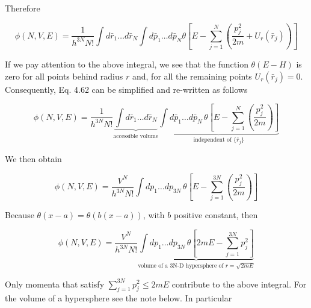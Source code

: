 \documentclass[12pt,a4paper]{report}
\newcommand{\esp}{\vspace{0.5cm}}
\begin{document}
	\esp
	
	\noindent Therefore
	
	\esp
	
	\begin{equation}
		\phi(N, V, E) = \frac{1}{h^{3N} N!} \int d\bar{r}_1 \dots d\bar{r}_N \int d\bar{p}_1 \dots d\bar{p}_N \theta \left[ E - \sum_{j=1}^N \left( \frac{p_j^2}{2m} + U_r(\bar{r}_j) \right) \right] \tag{4.62}
	\end{equation}
	
	\esp
	
	\noindent If we pay attention to the above integral, we see that the function $\theta(E - H)$ is zero for all points behind radius $r$ and, for all the remaining points $U_r(\bar{r}_j) = 0$. Consequently, Eq. 4.62 can be simplified and re-written as follows
	
	\esp
	
	\begin{equation}
		\phi(N,V,E) = \frac{1}{h^{3N} N!} \underbrace{\int d\bar{r}_1 \dots d\bar{r}_N}_{\text{accessible volume}} \underbrace{\int d\bar{p}_1 \dots d\bar{p}_N \, \theta \left[ E - \sum_{j=1}^N \left( \frac{p_j^2}{2m} \right) \right]}_{\text{independent of } \{\bar{r}_j\}} \tag{4.63}
	\end{equation}
	
	\esp
	
	\noindent We then obtain
	
	\esp
	
	\begin{equation}
		\phi(N,V,E) = \frac{V^N}{h^{3N} N!} \int d p_1 \dots d p_{3N} \, \theta \left[ E - \sum_{j=1}^{3N} \left( \frac{p_j^2}{2m} \right) \right] \tag{4.64}
	\end{equation}
	
	\esp
	
	\noindent Because $\theta(x - a) = \theta(b(x - a))$, with $b$ positive constant, then
	
	\esp
	
	\begin{equation}
		\phi(N,V,E) = \frac{V^N}{h^{3N} N!} \underbrace{\int d p_1 \dots d p_{3N} \, \theta \left[ 2mE - \sum_{j=1}^{3N} p_j^2 \right]}_{\text{volume of a 3N-D hypersphere of } r = \sqrt{2mE}} \tag{4.65}
	\end{equation}
	
	\esp
	
	\noindent Only momenta that satisfy $\sum_{j=1}^{3N} p_j^2 \leq 2mE$ contribute to the above integral. For the volume of a hypersphere see the note below. In particular
	
\end{document}
